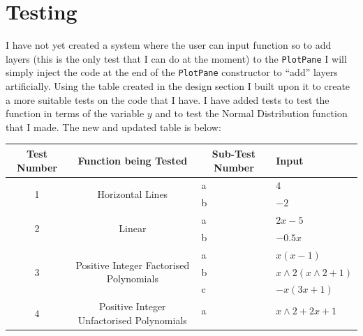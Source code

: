 \documentclass[../../../main.tex]{subfiles}
\begin{document}
\chapter{Testing}
I have not yet created a system where the user can input function so to add layers (this is the only test that I can do at the moment) to the \texttt{PlotPane} I will simply inject the code at the end of the \texttt{PlotPane} constructor to ``add'' layers artificially. Using the table created in the design section I built upon it to create a more suitable tests on the code that I have. I have added tests to test the function in terms of the variable $y$ and to test the Normal Distribution function that I made. The new and updated table is below:

\begin{table}[H]
\begin{tabular}{|c|c|l|l|}
\hline
Test Number        & Function being Tested                                      & \multicolumn{1}{c|}{Sub-Test Number} & Input                          \\ \hline
\multirow{2}{*}{1} & \multirow{2}{*}{Horizontal Lines}                          & a                                    & $4$                            \\ \cline{3-4} 
                   &                                                            & b                                    & $-2$                           \\ \hline
\multirow{2}{*}{2} & \multirow{2}{*}{Linear}                                    & a                                    & $2x-5$                         \\ \cline{3-4} 
                   &                                                            & b                                    & $-0.5x$                        \\ \hline
\multirow{3}{*}{3} & \multirow{3}{*}{Positive Integer Factorised Polynomials}   & a                                    & $x(x-1)$                       \\ \cline{3-4} 
                   &                                                            & b                                    & $x\wedge 2(x\wedge 2+1)$                   \\ \cline{3-4} 
                   &                                                            & c                                    & $-x(3x+1)$                     \\ \hline
\multirow{3}{*}{4} & \multirow{3}{*}{Positive Integer Unfactorised Polynomials} & a                                    & $x\wedge 2+2x+1$                     \\ \cline{3-4} 

\end{tabular}
\end{table}
\end{document}
